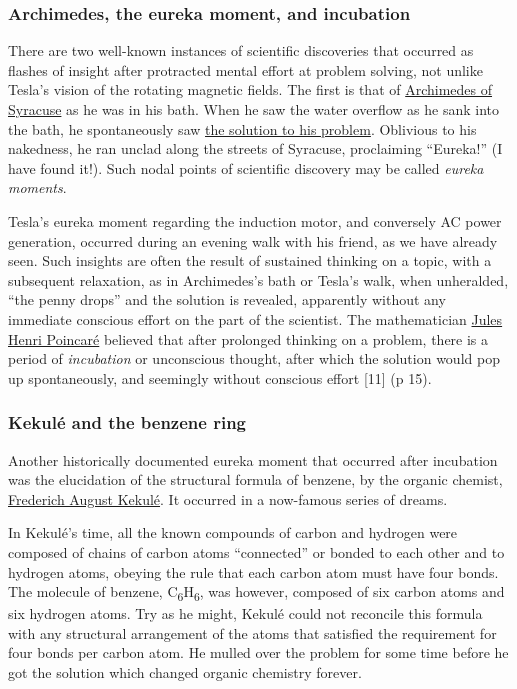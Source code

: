 \documentclass[
  12pt,
  british,
  a4paper,
]{article}
\begin{document}
\hypertarget{archimedes-the-eureka-moment-and-incubation}{%
\subsubsection{Archimedes, the eureka moment, and
incubation}\label{archimedes-the-eureka-moment-and-incubation}}

There are two well-known instances of scientific discoveries that
occurred as flashes of insight after protracted mental effort at problem
solving, not unlike Tesla's vision of the rotating magnetic fields. The
first is that of
\href{https://en.wikipedia.org/wiki/Archimedes}{Archimedes of Syracuse}
as he was in his bath. When he saw the water overflow as he sank into
the bath, he spontaneously saw
\href{https://en.wikipedia.org/wiki/Archimedes\#Archimedes'_principle}{the
solution to his problem}. Oblivious to his nakedness, he ran unclad
along the streets of Syracuse, proclaiming ``Eureka!'' (I have found
it!). Such nodal points of scientific discovery may be called
\emph{eureka moments}.

Tesla's eureka moment regarding the induction motor, and conversely AC
power generation, occurred during an evening walk with his friend, as we
have already seen. Such insights are often the result of sustained
thinking on a topic, with a subsequent relaxation, as in Archimedes's
bath or Tesla's walk, when unheralded, ``the penny drops'' and the
solution is revealed, apparently without any immediate conscious effort
on the part of the scientist. The mathematician
\href{https://en.wikipedia.org/wiki/Henri_Poincar\%C3\%A9}{Jules Henri
Poincaré} believed that after prolonged thinking on a problem, there is
a period of \emph{incubation} or unconscious thought, after which the
solution would pop up spontaneously, and seemingly without conscious
effort {[}11{]} (p 15).

\hypertarget{kekuluxe9-and-the-benzene-ring}{%
\subsubsection{Kekulé and the benzene
ring}\label{kekuluxe9-and-the-benzene-ring}}

Another historically documented eureka moment that occurred after
incubation was the elucidation of the structural formula of benzene, by
the organic chemist,
\href{https://en.wikipedia.org/wiki/August_Kekul\%C3\%A9}{Frederich
August Kekulé}. It occurred in a now-famous series of dreams.

In Kekulé's time, all the known compounds of carbon and hydrogen were
composed of chains of carbon atoms ``connected'' or bonded to each other
and to hydrogen atoms, obeying the rule that each carbon atom must have
four bonds. The molecule of benzene,
C\textsubscript{6}H\textsubscript{6}, was however, composed of six
carbon atoms and six hydrogen atoms. Try as he might, Kekulé could not
reconcile this formula with any structural arrangement of the atoms that
satisfied the requirement for four bonds per carbon atom. He mulled over
the problem for some time before he got the solution which changed
organic chemistry forever.
\end{document}
